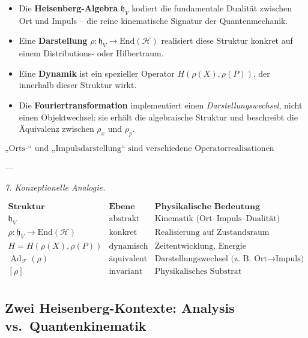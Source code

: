 \documentclass[10pt, letterpaper]{article}
\newcommand{\Ad}{\operatorname{Ad}}
\newcommand{\End}{\mathrm{End}}
\begin{document}
\begin{itemize}
\item Die \textbf{Heisenberg-Algebra} \(\mathfrak{h}_V\) kodiert die fundamentale Dualität
      zwischen Ort und Impuls – die reine kinematische Signatur der Quantenmechanik.
\item Eine \textbf{Darstellung} \(\rho:\mathfrak{h}_V\to\End(\mathcal{H})\)
      realisiert diese Struktur konkret auf einem Distributions- oder Hilbertraum.
\item Eine \textbf{Dynamik} ist ein spezieller Operator \(H(\rho(X),\rho(P))\),
      der innerhalb dieser Struktur wirkt.
\item Die \textbf{Fouriertransformation} implementiert einen
      \emph{Darstellungswechsel}, nicht einen Objektwechsel:
      sie erhält die algebraische Struktur und beschreibt die Äquivalenz
      zwischen \(\rho_x\) und \(\rho_p\).
\end{itemize}

\[
\boxed{
\text{„Orts-“ und „Impulsdarstellung“ sind verschiedene Operatorrealisationen
derselben abstrakten Heisenberg-Struktur.}
}
\]

---

\emph{7. Konzeptionelle Analogie.}

\[
\begin{array}{lll}
\textbf{Struktur} & \textbf{Ebene} & \textbf{Physikalische Bedeutung} \\[3pt]
\hline
\mathfrak{h}_V & \text{abstrakt} & \text{Kinematik (Ort–Impuls–Dualität)} \\[3pt]
\rho:\mathfrak{h}_V\to\End(\mathcal{H}) & \text{konkret} & \text{Realisierung auf Zustandsraum} \\[3pt]
H=H(\rho(X),\rho(P)) & \text{dynamisch} & \text{Zeitentwicklung, Energie} \\[3pt]
\Ad_{\mathcal{F}}(\rho) & \text{äquivalent} & \text{Darstellungswechsel (z. B. Ort→Impuls)} \\[3pt]
[\rho] & \text{invariant} & \text{Physikalisches Substrat (Darstellungsklasse)} \\
\end{array}
\]


\pagebreak



\subsection{Zwei Heisenberg-Kontexte: Analysis vs.\ Quantenkinematik}
\end{document}
